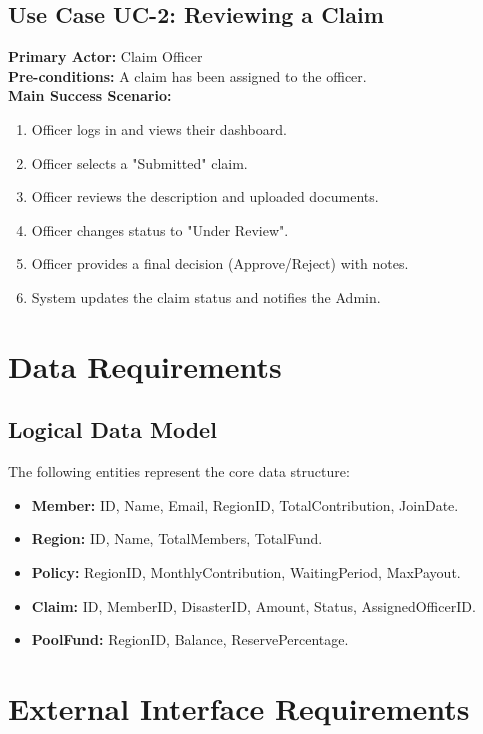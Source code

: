 \documentclass[12pt,a4paper]{article}
\begin{document}
\subsection{Use Case UC-2: Reviewing a Claim}
\textbf{Primary Actor:} Claim Officer \\
\textbf{Pre-conditions:} A claim has been assigned to the officer. \\
\textbf{Main Success Scenario:}
\begin{enumerate}
    \item Officer logs in and views their dashboard.
    \item Officer selects a "Submitted" claim.
    \item Officer reviews the description and uploaded documents.
    \item Officer changes status to "Under Review".
    \item Officer provides a final decision (Approve/Reject) with notes.
    \item System updates the claim status and notifies the Admin.
\end{enumerate}

\section{Data Requirements}

\subsection{Logical Data Model}
The following entities represent the core data structure:
\begin{itemize}
    \item \textbf{Member:} ID, Name, Email, RegionID, TotalContribution, JoinDate.
    \item \textbf{Region:} ID, Name, TotalMembers, TotalFund.
    \item \textbf{Policy:} RegionID, MonthlyContribution, WaitingPeriod, MaxPayout.
    \item \textbf{Claim:} ID, MemberID, DisasterID, Amount, Status, AssignedOfficerID.
    \item \textbf{PoolFund:} RegionID, Balance, ReservePercentage.
\end{itemize}

\section{External Interface Requirements}
\end{document}
